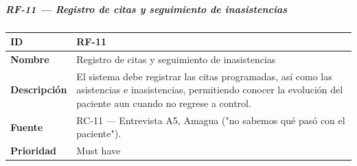 \documentclass[
]{article}
\newcounter{none} %
\begin{document}
\subparagraph{RF-11 --- Registro de citas y seguimiento de
inasistencias}\label{rf-11-registro-de-citas-y-seguimiento-de-inasistencias}

{\def\LTcaptype{none} %
\begin{longtable}[]{@{}
  >{\raggedright\arraybackslash}p{}
  >{\raggedright\arraybackslash}p{}@{}}
\toprule\noalign{}
\begin{minipage}[b]{\linewidth}\raggedright
\textbf{ID}
\end{minipage} & \begin{minipage}[b]{\linewidth}\raggedright
RF-11
\end{minipage} \\
\midrule\noalign{}
\endhead
\bottomrule\noalign{}
\endlastfoot
\textbf{Nombre} & \begin{minipage}[t]{\linewidth}\raggedright
Registro de citas y seguimiento de inasistencias
\end{minipage} \\
\textbf{Descripción} & \begin{minipage}[t]{\linewidth}\raggedright
El sistema debe registrar las citas programadas, así como las
asistencias e inasistencias, permitiendo conocer la evolución del
paciente aun cuando no regrese a control.
\end{minipage} \\
\textbf{Fuente} & \begin{minipage}[t]{\linewidth}\raggedright
RC-11 --- Entrevista A5, Amagua ("no sabemos qué pasó con el paciente").
\end{minipage} \\
\textbf{Prioridad} & \begin{minipage}[t]{\linewidth}\raggedright
Must have
\end{minipage} \\
\end{longtable}
}
\end{document}
